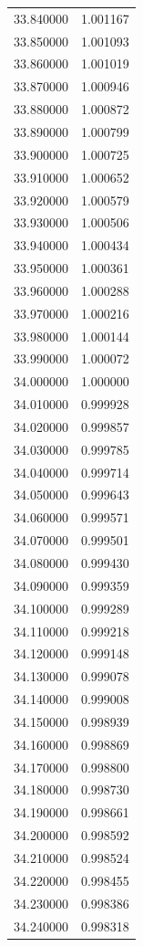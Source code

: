 \begin{tabular}{rr}
33.840000 & 1.001167 \\
33.850000 & 1.001093 \\
33.860000 & 1.001019 \\
33.870000 & 1.000946 \\
33.880000 & 1.000872 \\
33.890000 & 1.000799 \\
33.900000 & 1.000725 \\
33.910000 & 1.000652 \\
33.920000 & 1.000579 \\
33.930000 & 1.000506 \\
33.940000 & 1.000434 \\
33.950000 & 1.000361 \\
33.960000 & 1.000288 \\
33.970000 & 1.000216 \\
33.980000 & 1.000144 \\
33.990000 & 1.000072 \\
34.000000 & 1.000000 \\
34.010000 & 0.999928 \\
34.020000 & 0.999857 \\
34.030000 & 0.999785 \\
34.040000 & 0.999714 \\
34.050000 & 0.999643 \\
34.060000 & 0.999571 \\
34.070000 & 0.999501 \\
34.080000 & 0.999430 \\
34.090000 & 0.999359 \\
34.100000 & 0.999289 \\
34.110000 & 0.999218 \\
34.120000 & 0.999148 \\
34.130000 & 0.999078 \\
34.140000 & 0.999008 \\
34.150000 & 0.998939 \\
34.160000 & 0.998869 \\
34.170000 & 0.998800 \\
34.180000 & 0.998730 \\
34.190000 & 0.998661 \\
34.200000 & 0.998592 \\
34.210000 & 0.998524 \\
34.220000 & 0.998455 \\
34.230000 & 0.998386 \\
34.240000 & 0.998318 \\

\end{tabular}
